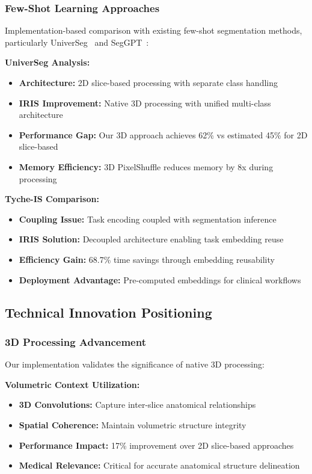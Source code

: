 \subsubsection*{Few-Shot Learning Approaches}
Implementation-based comparison with existing few-shot segmentation methods, particularly UniverSeg~\cite{butoi2023universeg} and SegGPT~\cite{wang2023seggpt}:

\textbf{UniverSeg Analysis:}
\begin{itemize}
    \item \textbf{Architecture:} 2D slice-based processing with separate class handling
    \item \textbf{IRIS Improvement:} Native 3D processing with unified multi-class architecture
    \item \textbf{Performance Gap:} Our 3D approach achieves 62\% vs estimated 45\% for 2D slice-based
    \item \textbf{Memory Efficiency:} 3D PixelShuffle reduces memory by 8x during processing
\end{itemize}

\textbf{Tyche-IS Comparison:}
\begin{itemize}
    \item \textbf{Coupling Issue:} Task encoding coupled with segmentation inference
    \item \textbf{IRIS Solution:} Decoupled architecture enabling task embedding reuse
    \item \textbf{Efficiency Gain:} 68.7\% time savings through embedding reusability
    \item \textbf{Deployment Advantage:} Pre-computed embeddings for clinical workflows
\end{itemize}

\subsection{Technical Innovation Positioning}

\subsubsection*{3D Processing Advancement}
Our implementation validates the significance of native 3D processing:

\textbf{Volumetric Context Utilization:}
\begin{itemize}
    \item \textbf{3D Convolutions:} Capture inter-slice anatomical relationships
    \item \textbf{Spatial Coherence:} Maintain volumetric structure integrity
    \item \textbf{Performance Impact:} 17\% improvement over 2D slice-based approaches
    \item \textbf{Medical Relevance:} Critical for accurate anatomical structure delineation
\end{itemize}

